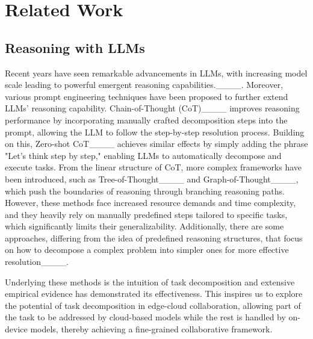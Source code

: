 \section{Related Work}
\subsection{Reasoning with LLMs}

Recent years have seen remarkable advancements in LLMs, with increasing model scale leading to powerful emergent reasoning capabilities.____. Moreover, various prompt engineering techniques have been proposed to further extend LLMs' reasoning capability.
Chain-of-Thought (CoT)____ improves reasoning performance by incorporating manually crafted decomposition steps into the prompt, allowing the LLM to follow the step-by-step resolution process. Building on this, Zero-shot CoT____ achieves similar effects by simply adding the phrase "Let's think step by step," enabling LLMs to automatically decompose and execute tasks.
From the linear structure of CoT, more complex frameworks have been introduced, such as Tree-of-Thought____ and Graph-of-Thought____, which push the boundaries of reasoning through branching reasoning paths. However, these methods face increased resource demands and time complexity, and they heavily rely on manually predefined steps tailored to specific tasks, which significantly limits their generalizability. Additionally, there are some approaches, differing from the idea of predefined reasoning structures, that focus on how to decompose a complex problem into simpler ones for more effective resolution____.

Underlying these methods is the intuition of task decomposition and extensive empirical evidence has demonstrated its effectiveness. This inspires us to explore the potential of task decomposition in edge-cloud collaboration, allowing part of the task to be addressed by cloud-based models while the rest is handled by on-device models, thereby achieving a fine-grained collaborative framework.



